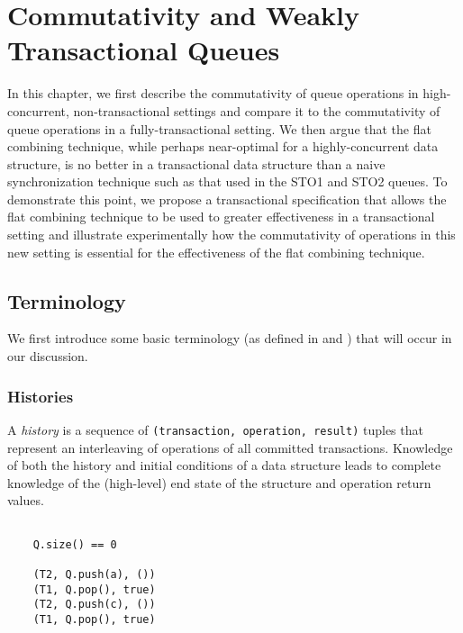 \chapter{Commutativity and Weakly Transactional Queues}
\label{commutativity}

In this chapter, we first describe the commutativity of queue operations in high-concurrent, non-transactional settings and compare it to the commutativity of queue operations in a fully-transactional setting. We then argue that the flat combining technique, while perhaps near-optimal for a highly-concurrent data structure, is no better in a transactional data structure than a naive synchronization technique such as that used in the STO1 and STO2 queues. To demonstrate this point, we propose a transactional specification that allows the flat combining technique to be used to greater effectiveness in a transactional setting and illustrate experimentally how the commutativity of operations in this new setting is essential for the effectiveness of the flat combining technique.

\section{Terminology}
We first introduce some basic terminology (as defined in \cite{schwarz} and \cite{weihl}) that will occur in our discussion.

\subsection{Histories}
\begin{defn}
    A \emph{history} is a sequence of \texttt{(transaction, operation, result)} tuples that represent an interleaving of operations of all committed transactions. Knowledge of both the history and initial conditions of a data structure leads to complete knowledge of the (high-level) end state of the structure and operation return values.

\begin{eg}
    \begin{lstlisting}
   
    Q.size() == 0

    (T2, Q.push(a), ())
    (T1, Q.pop(), true)
    (T2, Q.push(c), ())
    (T1, Q.pop(), true)
    \end{lstlisting}
\end{eg}

\end{defn}

